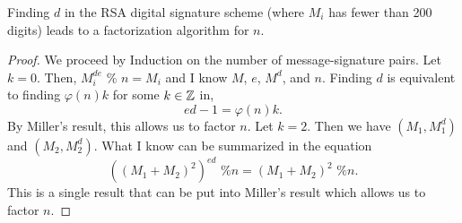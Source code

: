 \begin{proposition}
Finding $d$ in the RSA digital signature scheme (where $M_i$ has fewer than 200 digits) leads to a factorization algorithm for $n$.
\end{proposition}
\begin{proof}
We proceed by Induction on the number of message-signature pairs. 
Let $k = 0$. Then, $M_i^{de}$ \% $n = M_i$ and I know $M$, $e$, $M^d$, and $n$. Finding $d$ is equivalent to finding $\varphi(n)k$ for some $k \in \mathbb{Z}$ in, $$ ed-1 = \varphi(n)k.$$ By Miller's result, this allows us to factor $n$.
Let $k = 2$. Then we have $(M_1, M_1^d)$ and $(M_2, M_2^d)$. What I know can be summarized in the equation $$((M_1 + M_2)^2)^{ed}  \text{ \% }  n = (M_1 + M_2)^2  \text{ \% }  n.$$ This is a single result that can be put into Miller's result which allows us to factor $n$. 
\end{proof}
